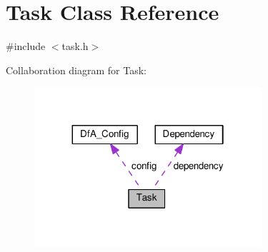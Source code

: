 \hypertarget{classTask}{}\section{Task Class Reference}
\label{classTask}


{\ttfamily \#include $<$task.\+h$>$}



Collaboration diagram for Task\+:
\nopagebreak
\begin{figure}[H]
\begin{center}
\leavevmode
\includegraphics[width=239pt]{classTask__coll__graph}
\end{center}
\end{figure}

